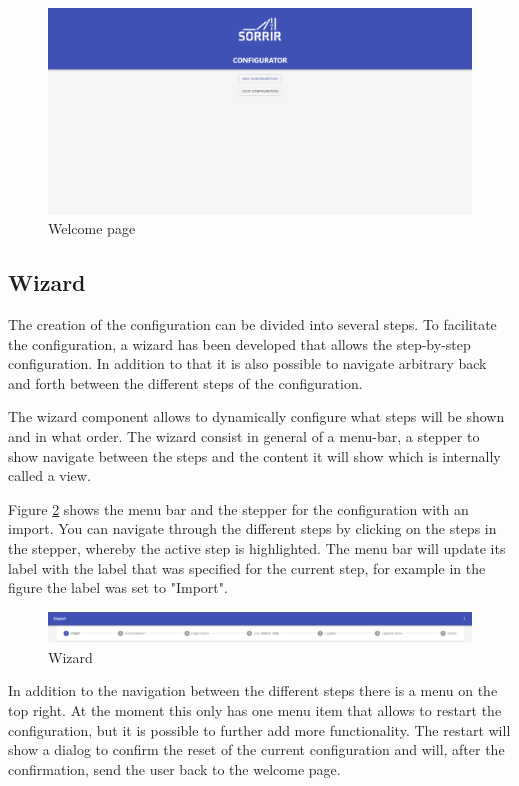 \begin{figure}[ht]
    \centering
    \includegraphics[width=\textwidth]{img/app_welcome.png}
    \caption{Welcome page}
    \label{fig:app_welcome}
\end{figure}

\subsection{Wizard}
\label{sec:wizard}
The creation of the configuration can be divided into several steps. To facilitate the configuration, a wizard has been developed that allows the step-by-step configuration. In addition to that it is also possible to navigate arbitrary back and forth between the different steps of the configuration. 

The wizard component allows to dynamically configure what steps will be shown and in what order. The wizard consist in general of a menu-bar, a stepper to show navigate between the steps and the content it will show which is internally called a view. 

Figure \ref{fig:wizard} shows the menu bar and the stepper for the configuration with an import. You can navigate through the different steps by clicking on the steps in the stepper, whereby the active step is highlighted. The menu bar will update its label with the label that was specified for the current step, for example in the figure the label was set to "Import".

\begin{figure}[ht]
    \centering
    \includegraphics[width=\textwidth]{img/wizard.png}
    \caption{Wizard}
    \label{fig:wizard}
\end{figure}

\noindent In addition to the navigation between the different steps there is a menu on the top right. At the moment this only has one menu item that allows to restart the configuration, but it is possible to further add more functionality. The restart will show a dialog to confirm the reset of the current configuration and will, after the confirmation, send the user back to the welcome page. \\

